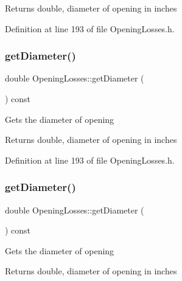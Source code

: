 \begin{DoxyReturn}{Returns}
double, diameter of opening in inches 
\end{DoxyReturn}


Definition at line 193 of file Opening\+Losses.\+h.

\mbox{\label{class_opening_losses_a8ed643300b0f5b606be6cd669cd413c3}} 
\subsubsection{\texorpdfstring{get\+Diameter()}{getDiameter()}\hspace{0.1cm}{\footnotesize\ttfamily [2/3]}}
{\footnotesize\ttfamily double Opening\+Losses\+::get\+Diameter (\begin{DoxyParamCaption}{ }\end{DoxyParamCaption}) const\hspace{0.3cm}{\ttfamily [inline]}}

Gets the diameter of opening

\begin{DoxyReturn}{Returns}
double, diameter of opening in inches 
\end{DoxyReturn}


Definition at line 193 of file Opening\+Losses.\+h.

\mbox{\label{class_opening_losses_a8ed643300b0f5b606be6cd669cd413c3}} 
\subsubsection{\texorpdfstring{get\+Diameter()}{getDiameter()}\hspace{0.1cm}{\footnotesize\ttfamily [3/3]}}
{\footnotesize\ttfamily double Opening\+Losses\+::get\+Diameter (\begin{DoxyParamCaption}{ }\end{DoxyParamCaption}) const\hspace{0.3cm}{\ttfamily [inline]}}

Gets the diameter of opening

\begin{DoxyReturn}{Returns}
double, diameter of opening in inches 
\end{DoxyReturn}


